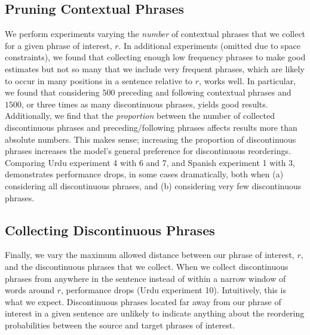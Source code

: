 \documentclass[11pt,letterpaper]{article}
\begin{document}
\subsection{Pruning Contextual Phrases}
We perform experiments varying the {\it number} of contextual phrases that we collect for a given phrase of interest, $r$. In additional experiments (omitted due to space constraints), we found that collecting enough low frequency phrases to make good estimates but not so many that we include very frequent phrases, which are likely to occur in many positions in a sentence relative to $r$, works well. In particular, we found that considering $500$ preceding and following contextual phrases and $1500$, or three times as many discontinuous phrases, yields good results. Additionally, we find that the {\it proportion} between the number of collected discontinuous phrases and preceding/following phrases affects results more than absolute numbers. This makes sense; increasing the proportion of discontinuous phrases increases the model's general preference for discontinuous reorderings. Comparing Urdu experiment 4 with 6 and 7, and Spanish experiment 1 with 3, demonstrates performance drops, in some cases dramatically, both when (a) considering all discontinuous phrases, and (b) considering very few discontinuous phrases. %

\subsection{Collecting Discontinuous Phrases}
Finally, we vary the maximum allowed distance between our phrase of interest, $r$, and the discontinuous phrases that we collect. 
When we collect discontinuous phrases from anywhere in the sentence instead of within a narrow window of words around $r$, performance drops (Urdu experiment 10).
Intuitively, this is what we expect. Discontinuous phrases located far away from our phrase of interest in a given sentence are unlikely to indicate anything about the reordering probabilities between the source and target phrases of interest.
\end{document}
